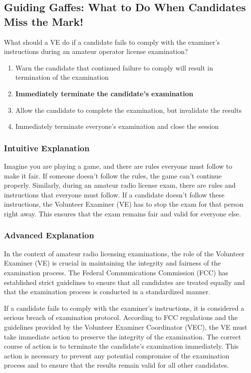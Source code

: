 \subsection{Guiding Gaffes: What to Do When Candidates Miss the Mark!}

\begin{tcolorbox}[colback=gray!10!white,colframe=black!75!black,title=E1E07] What should a VE do if a candidate fails to comply with the examiner’s instructions during an amateur operator license examination?
    \begin{enumerate}[label=\Alph*]
        \item Warn the candidate that continued failure to comply will result in termination of the examination
        \item \textbf{Immediately terminate the candidate’s examination}
        \item Allow the candidate to complete the examination, but invalidate the results
        \item Immediately terminate everyone’s examination and close the session
    \end{enumerate}
\end{tcolorbox}

\subsubsection{Intuitive Explanation}
Imagine you are playing a game, and there are rules everyone must follow to make it fair. If someone doesn’t follow the rules, the game can’t continue properly. Similarly, during an amateur radio license exam, there are rules and instructions that everyone must follow. If a candidate doesn’t follow these instructions, the Volunteer Examiner (VE) has to stop the exam for that person right away. This ensures that the exam remains fair and valid for everyone else.

\subsubsection{Advanced Explanation}
In the context of amateur radio licensing examinations, the role of the Volunteer Examiner (VE) is crucial in maintaining the integrity and fairness of the examination process. The Federal Communications Commission (FCC) has established strict guidelines to ensure that all candidates are treated equally and that the examination process is conducted in a standardized manner.

If a candidate fails to comply with the examiner’s instructions, it is considered a serious breach of examination protocol. According to FCC regulations and the guidelines provided by the Volunteer Examiner Coordinator (VEC), the VE must take immediate action to preserve the integrity of the examination. The correct course of action is to terminate the candidate’s examination immediately. This action is necessary to prevent any potential compromise of the examination process and to ensure that the results remain valid for all other candidates.

